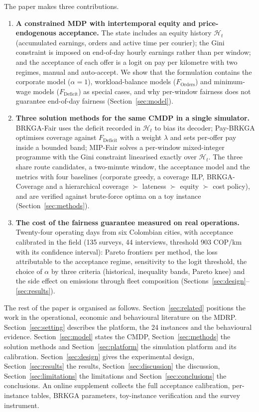 \documentclass[preprint,12pt,authoryear]{elsarticle}%
\newcommand{\Hist}{\mathcal{H}}
\newcommand{\FD}{F_{\text{Deficit}}}
\newcommand{\FO}{F_{\text{Orders}}}
\begin{document}
The paper makes three contributions.
\begin{enumerate}[label=(\roman*)]
\item \textbf{A constrained MDP with intertemporal equity and price-endogenous acceptance.} The state includes an equity history $\Hist_t$ (accumulated earnings, orders and active time per courier); the Gini constraint is imposed on end-of-day hourly earnings rather than per window; and the acceptance of each offer is a logit on pay per kilometre with two regimes, manual and auto-accept. We show that the formulation contains the corporate model ($\alpha=1$), workload-balance models ($\FO$) and minimum-wage models ($\FD$) as special cases, and why per-window fairness does not guarantee end-of-day fairness (Section~\ref{sec:model}).
\item \textbf{Three solution methods for the same CMDP in a single simulator.} BRKGA-Fair uses the deficit recorded in $\Hist_t$ to bias its decoder; Pay-BRKGA optimises coverage against $\FD$ with a weight $\lambda$ and sets per-offer pay inside a bounded band; MIP-Fair solves a per-window mixed-integer programme with the Gini constraint linearised exactly over $\Hist_t$. The three share route candidates, a two-minute window, the acceptance model and the metrics with four baselines (corporate greedy, a coverage ILP, BRKGA-Coverage and a hierarchical coverage $\succ$ lateness $\succ$ equity $\succ$ cost policy), and are verified against brute-force optima on a toy instance (Section~\ref{sec:methods}).
\item \textbf{The cost of the fairness guarantee measured on real operations.} Twenty-four operating days from six Colombian cities, with acceptance calibrated in the field (135 surveys, 44 interviews, threshold 903 COP/km with its confidence interval): Pareto frontiers per method, the loss attributable to the acceptance regime, sensitivity to the logit threshold, the choice of $\alpha$ by three criteria (historical, inequality bands, Pareto knee) and the side effect on emissions through fleet composition (Sections~\ref{sec:design}--\ref{sec:results}).
\end{enumerate}

The rest of the paper is organised as follows. Section~\ref{sec:related} positions the work in the operational, economic and behavioural literature on the MDRP. Section~\ref{sec:setting} describes the platform, the 24 instances and the behavioural evidence. Section~\ref{sec:model} states the CMDP, Section~\ref{sec:methods} the solution methods and Section~\ref{sec:platform} the simulation platform and its calibration. Section~\ref{sec:design} gives the experimental design, Section~\ref{sec:results} the results, Section~\ref{sec:discussion} the discussion, Section~\ref{sec:limitations} the limitations and Section~\ref{sec:conclusions} the conclusions. An online supplement collects the full acceptance calibration, per-instance tables, BRKGA parameters, toy-instance verification and the survey instrument.
\end{document}
